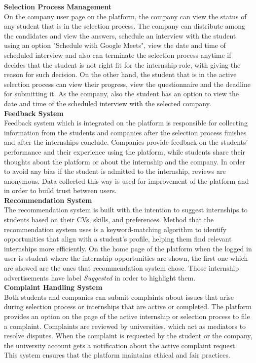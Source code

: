 \textbf{Selection Process Management} \\
On the company user page on the platform, the company can view the status of any student that is in the selection process. The company can distribute among the candidates and view the answers, schedule an interview with the student using an option "Schedule with Google Meets", view the date and time of scheduled interview and also can terminate the selection process anytime if decides that the student is not right fit for the internship role, with giving the reason for such decision. On the other hand, the student that is in the active selection process can view their progress, view the questionnaire and the deadline for submitting it. As the company, also the student has an option to view the date and time of the scheduled interview with the selected company. \\

\textbf{Feedback System} \\
Feedback system which is integrated on the platform is responsible for collecting information from the students and companies after the selection process finishes and after the internships conclude. Companies provide feedback on the students’ performance and their experience using the platform, while students share their thoughts about the platform or about the internship and the company. In order to avoid any bias if the student is admitted to the internship, reviews are anonymous. Data collected this way is used for improvement of the platform and in order to build trust between users. \\

\textbf{Recommendation System} \\
The recommendation system is built with the intention to suggest internships to students based on their CVs, skills, and preferences. Method that the recommendation system uses is  a keyword-matching algorithm to identify opportunities that align with a student’s profile, helping them find relevant internships more efficiently. On the home page of the platform when the logged in user is student where the internship opportunities are shown, the first one which are showed are the ones that recommendation system chose. Those internship advertisements have label \textit{Suggested} in order to highlight them.\\

\textbf{Complaint Handling System} \\
Both students and companies can submit complaints about issues that arise during selection process or internships that are active or completed. The platform provides an option on the page of the active internship or selection process to file a complaint. Complaints are reviewed by universities, which act as mediators to resolve disputes. When the complaint is requested by the student or the company, the university account gets a notification about the active complaint request. This system ensures that the platform maintains ethical and fair practices. \\


